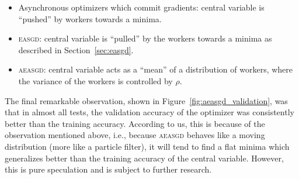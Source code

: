 \begin{itemize}
\item Asynchronous optimizers which commit gradients: central variable is ``pushed'' by workers towards a minima.
\item \textsc{easgd}: central variable is ``pulled'' by the workers towards a minima as described in Section~\ref{sec:easgd}.
\item \textsc{aeasgd}: central variable acts as a ``mean'' of a distribution of workers, where the variance of the workers is controlled by $\rho$.
\end{itemize}

The final remarkable observation, shown in Figure~\ref{fig:aeasgd_validation}, was that in almost all tests, the validation accuracy of the optimizer was consistently better than the training accuracy. According to us, this is because of the observation mentioned above, i.e., because \textsc{aeasgd} behaves like a moving distribution (more like a particle filter), it will tend to find a flat minima which generalizes better than the training accuracy of the central variable. However, this is pure speculation and is subject to further research.

